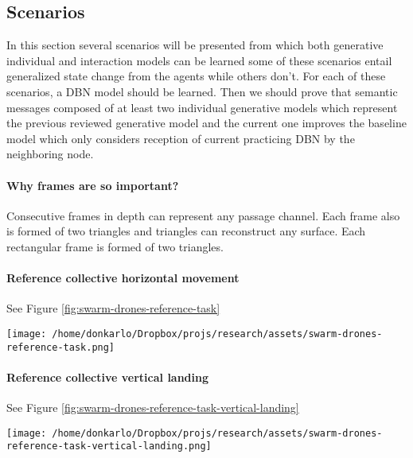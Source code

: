 \documentclass{article}
\begin{document}
		\subsection{Scenarios} \label{experimental-scenarios}
			In this section several scenarios will be presented from which both generative individual and interaction models can be learned
			some of these scenarios entail generalized state change from the agents while others don't. For each of these scenarios, a DBN model should be learned. Then we should prove that semantic messages composed of at least two individual generative models which represent the previous reviewed generative model and the current one improves the baseline model which only considers reception of current practicing DBN by the neighboring node. 
			
			\paragraph{Why frames are so important?}
			Consecutive frames in depth  can represent any passage channel. Each frame also is formed of two triangles and triangles can reconstruct any surface. Each rectangular frame is formed of two triangles.
			
			\paragraph{Reference collective horizontal movement}
				See Figure \ref{fig:swarm-drones-reference-task}
				\begin{figure*}
					\centering
					\texttt{[image: /home/donkarlo/Dropbox/projs/research/assets/swarm-drones-reference-task.png]}
					\caption{Reference task for which an initial model should be learned}
					\label{fig:swarm-drones-reference-task}
				\end{figure*}
			\paragraph{Reference collective vertical landing}
				See Figure \ref{fig:swarm-drones-reference-task-vertical-landing}
				\begin{figure*}
					\centering
					\texttt{[image: /home/donkarlo/Dropbox/projs/research/assets/swarm-drones-reference-task-vertical-landing.png]}
					\caption{Reference task for which an initial model should be learned for vertical landing}
					\label{fig:swarm-drones-reference-task-vertical-landing}
				\end{figure*}
\end{document}
